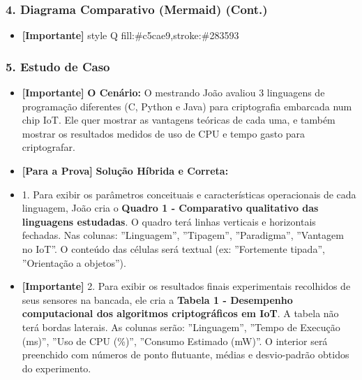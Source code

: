 \documentclass[10pt, aspectratio=169]{slidesiffmodelo}
\begin{document}
\begin{frame}[t]
    \frametitle{\color{iffgold}4. Diagrama Comparativo (Mermaid) (Cont.)}
    \begin{itemize}
        \item \textcolor{iffgreen}{\textbf{[Importante]} style Q fill:\#c5cae9,stroke:\#283593}
    \end{itemize}
\end{frame}

\begin{frame}[t]
    \frametitle{\color{iffgold}5. Estudo de Caso}
    \begin{itemize}
        \item \textcolor{iffgreen}{\textbf{[Importante]} \textbf{O Cenário:} O mestrando João avaliou 3 linguagens de programação diferentes (C, Python e Java) para criptografia embarcada num chip IoT. Ele quer mostrar as vantagens teóricas de cada uma, e também mostrar os resultados medidos de uso de CPU e tempo gasto para criptografar.}
        \item \textcolor{iffviolet}{\textbf{[Para a Prova]} \textbf{Solução Híbrida e Correta:}}
        \item 1.  Para exibir os parâmetros conceituais e características operacionais de cada linguagem, João cria o \textbf{Quadro 1 - Comparativo qualitativo das linguagens estudadas}. O quadro terá linhas verticais e horizontais fechadas. Nas colunas: ''Linguagem'', ''Tipagem'', ''Paradigma'', ''Vantagem no IoT''. O conteúdo das células será textual (ex: ''Fortemente tipada'', ''Orientação a objetos'').
        \item \textcolor{iffgreen}{\textbf{[Importante]} 2.  Para exibir os resultados finais experimentais recolhidos de seus sensores na bancada, ele cria a \textbf{Tabela 1 - Desempenho computacional dos algoritmos criptográficos em IoT}. A tabela não terá bordas laterais. As colunas serão: ''Linguagem'', ''Tempo de Execução (ms)'', ''Uso de CPU (\%)'', ''Consumo Estimado (mW)''. O interior será preenchido com números de ponto flutuante, médias e desvio-padrão obtidos do experimento.}
    \end{itemize}
\end{frame}
\end{document}
